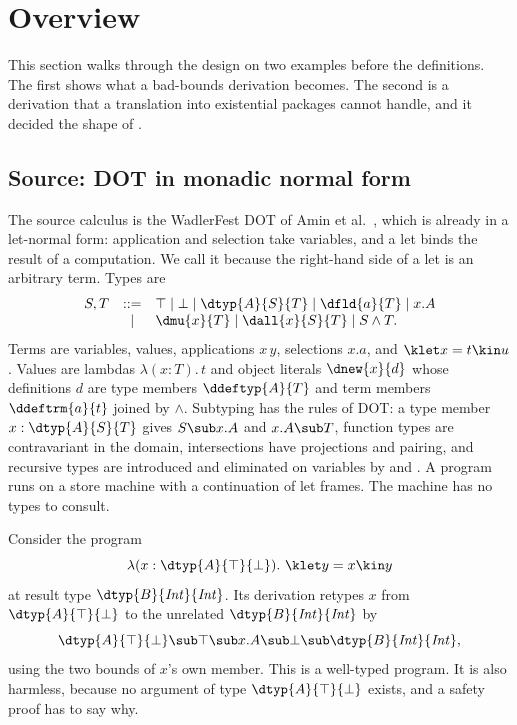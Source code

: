 \section{Overview}\label{sec:overview}

This section walks through the design on two examples before the definitions. The first shows what a bad-bounds derivation becomes. The second is a derivation that a translation into existential packages cannot handle, and it decided the shape of \FCdot.

\subsection{Source: DOT in monadic normal form}

The source calculus is the WadlerFest DOT of Amin et al.\ \cite{amin2016essence}, which is already in a let-normal form: application and selection take variables, and a let binds the result of a computation. We call it \DOTMNF because the right-hand side of a let is an arbitrary term. Types are
\[
\begin{array}{@{}rcl@{}}
S, T & ::= & \top \mid \bot \mid \dtyp{A}{S}{T} \mid \dfld{a}{T} \mid x.A \\
& \mid & \dmu{x}{T} \mid \dall{x}{S}{T} \mid S \wedge T .
\end{array}
\]
Terms are variables, values, applications $x\,y$, selections $x.a$, and $\klet x = t \kin u$. Values are lambdas $\lambda(x:T).\,t$ and object literals $\dnew{x}{d}$ whose definitions $d$ are type members $\ddeftyp{A}{T}$ and term members $\ddeftrm{a}{t}$ joined by $\wedge$. Subtyping has the rules of DOT: a type member $x : \dtyp{A}{S}{T}$ gives $S \sub x.A$ and $x.A \sub T$, function types are contravariant in the domain, intersections have projections and pairing, and recursive types are introduced and eliminated on variables by  and . A program runs on a store machine with a continuation of let frames. The machine has no types to consult.

Consider the program
\[
\lambda(x : \dtyp{A}{\top}{\bot}).\ \klet y = x \kin y
\]
at result type $\dtyp{B}{\mathit{Int}}{\mathit{Int}}$. Its derivation retypes $x$ from $\dtyp{A}{\top}{\bot}$ to the unrelated $\dtyp{B}{\mathit{Int}}{\mathit{Int}}$ by
\[
\dtyp{A}{\top}{\bot} \sub \top \sub x.A \sub \bot \sub \dtyp{B}{\mathit{Int}}{\mathit{Int}},
\]
using the two bounds of $x$'s own member. This is a well-typed program. It is also harmless, because no argument of type $\dtyp{A}{\top}{\bot}$ exists, and a safety proof has to say why.

